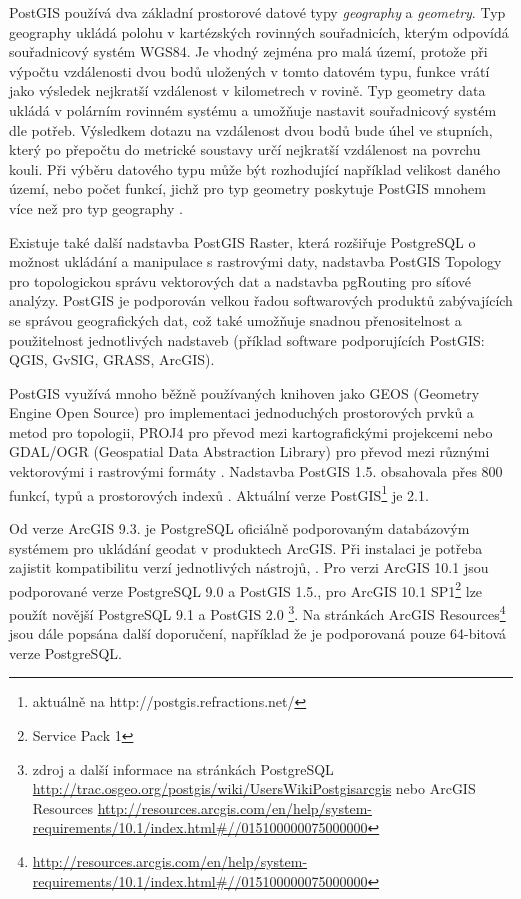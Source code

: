 PostGIS používá dva základní prostorové datové typy {\it geography} a {\it geometry}. Typ geography ukládá polohu v kartézských rovinných souřadnicích, kterým odpovídá souřadnicový systém WGS84. Je vhodný zejména pro malá území, protože při výpočtu vzdálenosti dvou bodů uložených v tomto datovém typu, funkce vrátí jako výsledek nejkratší vzdálenost v kilometrech v rovině. Typ geometry data ukládá v polárním rovinném systému a umožňuje nastavit souřadnicový systém dle potřeb. Výsledkem dotazu na vzdálenost dvou bodů bude úhel ve stupních, který po přepočtu do metrické soustavy určí nejkratší vzdálenost na povrchu kouli. Při výběru datového typu může být rozhodující například velikost daného území, nebo počet funkcí, jichž pro typ geometry poskytuje PostGIS mnohem více než pro typ geography \citep{OpenGeo2012}.

Existuje také další nadstavba PostGIS Raster, která rozšiřuje PostgreSQL o možnost ukládání a manipulace s rastrovými daty, nadstavba PostGIS Topology pro topologickou správu vektorových dat a nadstavba pgRouting pro síťové analýzy. PostGIS je podporován velkou řadou softwarových produktů zabývajících se správou geografických dat, což také umožňuje snadnou přenositelnost a použitelnost jednotlivých nadstaveb (příklad software podporujících PostGIS: QGIS, GvSIG, GRASS, ArcGIS).

PostGIS využívá mnoho běžně používaných knihoven jako GEOS (Geometry Engine Open Source) pro implementaci jednoduchých prostorových prvků a metod pro topologii, PROJ4 pro převod mezi kartografickými projekcemi nebo GDAL/OGR (Geospatial Data Abstraction Library) pro převod mezi různými vektorovými i rastrovými formáty \citep{ObeHsu2011}. Nadstavba PostGIS 1.5. obsahovala přes 800 funkcí, typů a prostorových indexů \citep{ObeHsu2012}. Aktuální verze PostGIS\footnote{aktuálně na http://postgis.refractions.net/} je 2.1.

Od verze ArcGIS 9.3. je PostgreSQL oficiálně podporovaným databázovým systémem pro ukládání geodat v produktech ArcGIS. Při instalaci je potřeba zajistit kompatibilitu verzí jednotlivých nástrojů, . Pro verzi ArcGIS 10.1 jsou podporované verze PostgreSQL 9.0 a PostGIS 1.5., pro ArcGIS 10.1 SP1\footnote{Service Pack 1} lze použít novější PostgreSQL 9.1 a PostGIS 2.0 \citep{OSGEO2013}\footnote{zdroj a další informace na stránkách PostgreSQL \url{http://trac.osgeo.org/postgis/wiki/UsersWikiPostgisarcgis} nebo ArcGIS Resources \url{http://resources.arcgis.com/en/help/system-requirements/10.1/index.html\#//015100000075000000}}. Na stránkách ArcGIS Resources\footnote{\url{http://resources.arcgis.com/en/help/system-requirements/10.1/index.html\#//015100000075000000}} jsou dále popsána další doporučení, například že je podporovaná pouze 64-bitová verze PostgreSQL. 


